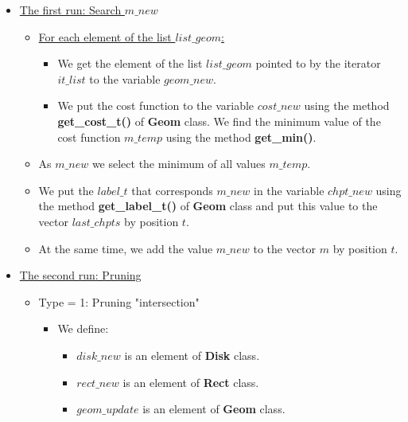 \documentclass{report}
\begin{document}
\begin{itemize}
	\item \underline {The first run: Search $m\_new$}
	\begin{itemize}
		\item \underline {For each element of the list $list\_geom$:} 
		
		\begin{itemize}
			\item We get the element of the list $list\_geom$  pointed to by the iterator $it\_list$ to the variable $geom\_new$.
			
			\item We put the cost function to the variable $cost\_new$ using the method {\bfseries get\_cost\_t()} of {\bfseries Geom} class. We find the minimum value of the cost function $m\_temp$ using the method {\bfseries get\_min()}. 
		\end{itemize}
	
		\item As $m\_new$ we select the minimum of all values $m\_temp$.
		
		\item We put the $label\_t$ that corresponds $m\_new$ in the variable $chpt\_new$  using the method {\bfseries get\_label\_t()} of {\bfseries Geom} class and put this value to the vector $last\_chpts$ by position $t$.
		
		\item At the same time, we add the value $m\_new$ to the vector $m$ by position $t$. 
	\end{itemize}

	\item \underline {The second run: Pruning}
	
	\begin{itemize}
		\item Type = 1: Pruning "intersection"
		
		\begin{itemize}
			\item We define:
		
			\begin{itemize}
				\item $disk\_new$ is an element of {\bfseries Disk} class.
			
				\item $rect\_new$ is an element of {\bfseries Rect} class.
			
				\item $geom\_update$ is an element of {\bfseries Geom} class.
			

\end{itemize}
\end{itemize}
\end{itemize}
\end{itemize}
\end{document}
